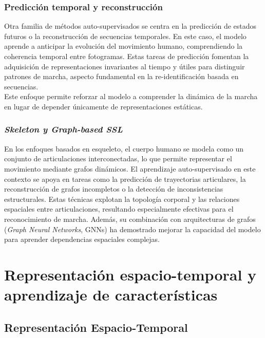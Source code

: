 \subsubsection{Predicción temporal y reconstrucción}

Otra familia de métodos auto-supervisados se centra en la predicción de estados futuros o la reconstrucción de secuencias temporales. En este caso, el modelo aprende a anticipar la evolución del movimiento humano, comprendiendo la coherencia temporal entre fotogramas. Estas tareas de predicción fomentan la adquisición de representaciones invariantes al tiempo y útiles para distinguir patrones de marcha, aspecto fundamental en la re-identificación basada en secuencias. \\
Este enfoque permite reforzar al modelo a comprender la dinámica de la marcha en lugar de depender únicamente de representaciones estáticas.

\subsubsection{\textit{Skeleton y Graph-based SSL}}

En los enfoques basados en esqueleto, el cuerpo humano se modela como un conjunto de articulaciones interconectadas, lo que permite representar el movimiento mediante grafos dinámicos. El aprendizaje auto-supervisado en este contexto se apoya en tareas como la predicción de trayectorias articulares, la reconstrucción de grafos incompletos o la detección de inconsistencias estructurales.  
Estas técnicas explotan la topología corporal y las relaciones espaciales entre articulaciones, resultando especialmente efectivas para el reconocimiento de marcha. Además, su combinación con arquitecturas de grafos (\textit{Graph Neural Networks}, GNNs) ha demostrado mejorar la capacidad del modelo para aprender dependencias espaciales complejas.

\section{Representación espacio-temporal y aprendizaje de características}

\subsection{Representación Espacio-Temporal}

